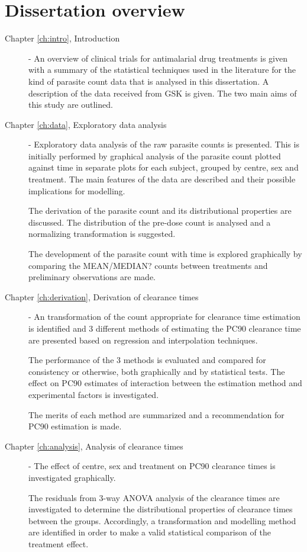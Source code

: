 \section{Dissertation overview}
\begin{description}
\item[Chapter \ref{ch:intro}, Introduction] - An overview of clinical trials for antimalarial drug treatments is given with a summary of the statistical techniques used in the literature for the kind of parasite count data that is analysed in this dissertation. A description of the data received from GSK is given. The two main aims of this study are outlined.
\item[Chapter \ref{ch:data}, Exploratory data analysis] - Exploratory data analysis of the raw parasite counts is presented. This is initially performed by graphical analysis of the parasite count plotted against time in separate plots for each subject, grouped by centre, sex and treatment. The main features of the data are described and their possible implications for modelling.

The derivation of the parasite count and its distributional properties are discussed. The distribution of the pre-dose count is analysed and a normalizing transformation is suggested.

The development of the parasite count with time is explored graphically by comparing the MEAN/MEDIAN? counts between treatments and preliminary observations are made.
\item[Chapter \ref{ch:derivation}, Derivation of clearance times] - An transformation of the count appropriate for clearance time estimation is identified and 3 different methods of estimating the PC90 clearance time are presented based on regression and interpolation techniques.

The performance of the 3 methods is evaluated and compared for consistency or otherwise, both graphically and by statistical tests. The effect on PC90 estimates of interaction between the estimation method and experimental factors is investigated.

The merits of each method are summarized and a recommendation for PC90 estimation is made.
\item[Chapter \ref{ch:analysis}, Analysis of clearance times] - The effect of centre, sex and treatment on PC90 clearance times is investigated graphically.

The residuals from 3-way ANOVA analysis of the clearance times are investigated to determine the distributional properties of clearance times between the groups. Accordingly, a transformation and modelling method are identified in order to make a valid statistical comparison of the treatment effect.


\end{description}
